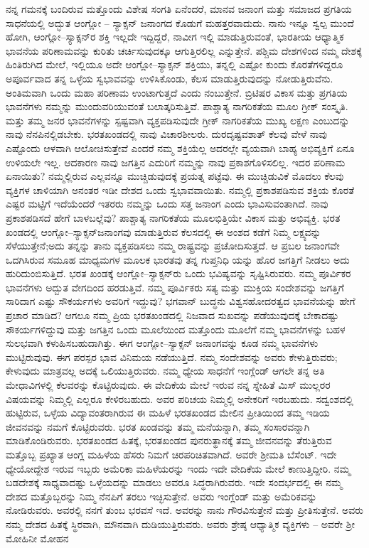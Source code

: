 ನನ್ನ ಗಮನಕ್ಕೆ ಬಂದಿರುವ ಮತ್ತೊಂದು ವಿಶೇಷ ಸಂಗತಿ ಏನೆಂದರೆ, ಮಾನವ ಜನಾಂಗ ಮತ್ತು ಸಮಾಜದ ಪ್ರಗತಿಯ ಸಾಧನೆಯಲ್ಲಿ ಅದ್ಭುತ ಆಂಗ್ಲೋ – ಸ್ಯಾಕ್ಸನ್​ ಜನಾಂಗದ ಕೊಡುಗೆ ಮಹತ್ತರವಾದುದು. ನಾನು ಇನ್ನೂ ಸ್ವಲ್ಪ ಮುಂದೆ ಹೋಗಿ, ಆಂಗ್ಲೋ–ಸ್ಯಾಕ್ಸನ್​ರ ಶಕ್ತಿ ಇಲ್ಲದೇ ಇದ್ದಿದ್ದರೆ, ನಾವೀಗ ಇಲ್ಲಿ ಮಾಡುತ್ತಿರುವಂತೆ, ಭಾರತೀಯ ಆಧ್ಯಾತ್ಮಿಕ ಭಾವನೆಯ ಪರಿಣಾಮವನ್ನು ಕುರಿತು ಚರ್ಚಿಸುವುದಕ್ಕೂ ಆಗುತ್ತಿರಲಿಲ್ಲ ಎನ್ನುತ್ತೇನೆ. ಪಶ್ಚಿಮ ದೇಶಗಳಿಂದ ನಮ್ಮ ದೇಶಕ್ಕೆ ಹಿಂತಿರುಗಿದ ಮೇಲೆ, ಇಲ್ಲಿಯೂ ಅದೇ ಆಂಗ್ಲೋ–ಸ್ಯಾಕ್ಸನ್​ ಶಕ್ತಿಯು, ತನ್ನಲ್ಲಿ ಎಷ್ಟೋ ಕುಂದು ಕೊರತೆಗಳಿದ್ದರೂ ಅಪೂರ್ವವಾದ ತನ್ನ ಒಳ್ಳೆಯ ಸ್ವಭಾವವನ್ನು ಉಳಿಸಿಕೊಂಡು, ಕೆಲಸ ಮಾಡುತ್ತಿರುವುದನ್ನು ನೋಡುತ್ತಿರುವೆನು. ಅಂತಿಮವಾಗಿ ಒಂದು ಮಹಾ ಪರಿಣಾಮ ಉಂಟಾಗುತ್ತದೆ ಎಂದು ನಂಬುತ್ತೇನೆ. ಬ್ರಿಟಿಷರ ವಿಕಾಸ ಮತ್ತು ಪ್ರಗತಿಯ ಭಾವನೆಗಳು ನಮ್ಮನ್ನು ಮುಂದುವರಿಯುವಂತೆ ಬಲಾತ್ಕರಿಸುತ್ತಿವೆ. ಪಾಶ್ಚಾತ್ಯ ನಾಗರಿಕತೆಯ ಮೂಲ ಗ್ರೀಕ್​ ಸಂಸ್ಕೃತಿ. ಮತ್ತು ತಮ್ಮ ಜನರ ಭಾವನೆಗಳನ್ನು ಸ್ಪಷ್ಟವಾಗಿ ವ್ಯಕ್ತಪಡಿಸುವುದೇ ಗ್ರೀಕ್​ ನಾಗರಿಕತೆಯ ಮುಖ್ಯ ಲಕ್ಷಣ ಎಂಬುದನ್ನು ನಾವು ನೆನಪಿನಲ್ಲಿಡಬೇಕು. ಭರತಖಂಡದಲ್ಲಿ ನಾವು ವಿಚಾರಶೀಲರು. ದುರದೃಷ್ಟವಶಾತ್​ ಕೆಲವು ವೇಳೆ ನಾವು ಎಷ್ಟೊಂದು ಆಳವಾಗಿ ಆಲೋಚಿಸುತ್ತೇವೆ ಎಂದರೆ ನಮ್ಮ ಶಕ್ತಿಯೆಲ್ಲ ಅದರಲ್ಲೇ ವ್ಯಯವಾಗಿ ಬಾಹ್ಯ ಅಭಿವ್ಯಕ್ತಿಗೆ ಏನೂ ಉಳಿಯಲೇ ಇಲ್ಲ. ಆದಕಾರಣ ನಾವು ಜಗತ್ತಿನ ಎದುರಿಗೆ ನಮ್ಮನ್ನು ನಾವು ಪ್ರಕಾಶಗೊಳಿಸಲಿಲ್ಲ. ಇದರ ಪರಿಣಾಮ ಏನಾಯಿತು? ನಮ್ಮಲ್ಲಿರುವ ಎಲ್ಲವನ್ನೂ ಮುಚ್ಚಿಡುವುದಕ್ಕೆ ಪ್ರಯತ್ನ ಪಟ್ಟೆವು. ಈ ಮುಚ್ಚಿಡುವಿಕೆ ಮೊದಲು ಕೆಲವು ವ್ಯಕ್ತಿಗಳ ಚಾಳಿಯಾಗಿ ಅನಂತರ ಇಡೀ ದೇಶದ ಒಂದು ಸ್ವಭಾವವಾಯಿತು. ನಮ್ಮಲ್ಲಿ ಪ್ರಕಾಶಪಡಿಸುವ ಶಕ್ತಿಯ ಕೊರತೆ ಎಷ್ಟರ ಮಟ್ಟಿಗೆ ಇದೆಯೆಂದರೆ ಇತರರು ನಮ್ಮನ್ನು ಒಂದು ಸತ್ತ ಜನಾಂಗ ಎಂದು ಭಾವಿಸುವಂತಾಗಿದೆ. ನಾವು ಪ್ರಕಾಶಪಡಿಸದೆ ಹೇಗೆ ಬಾಳಬಲ್ಲೆವು? ಪಾಶ್ಚಾತ್ಯ ನಾಗರಿಕತೆಯ ಮೂಲಭಿತ್ತಿಯೇ ವಿಕಾಸ ಮತ್ತು ಅಭಿವ್ಯಕ್ತಿ. ಭರತ ಖಂಡದಲ್ಲಿ ಆಂಗ್ಲೋ–ಸ್ಯಾಕ್ಸನ್​ ಜನಾಂಗವು ಮಾಡುತ್ತಿರುವ ಕೆಲಸದಲ್ಲಿ ಈ ಅಂಶದ ಕಡೆಗೆ ನಿಮ್ಮ ಲಕ್ಷ್ಯವನ್ನು ಸೆಳೆಯುತ್ತೇನೆ;ಅದು ತನ್ನನ್ನು ತಾನು ವ್ಯಕ್ತಪಡಿಸಲು ನಮ್ಮ ರಾಷ್ಟ್ರವನ್ನು ಪ್ರಚೋದಿಸುತ್ತದೆ. ಆ ಪ್ರಬಲ ಜನಾಂಗವೇ ಒದಗಿಸಿರುವ ಸಮೂಹ ಮಾಧ್ಯಮಗಳ ಮೂಲಕ ಭಾರತವು ತನ್ನ ಗುಪ್ತನಿಧಿ ಯನ್ನು ಹೊರ ಜಗತ್ತಿಗೆ ನೀಡಲು ಅದು ಹುರಿದುಂಬಿಸುತ್ತಿದೆ. ಭರತ ಖಂಡಕ್ಕೆ ಆಂಗ್ಲೋ–ಸ್ಯಾಕ್ಸನ್​ರು ಒಂದು ಭವಿಷ್ಯವನ್ನು ಸೃಷ್ಟಿಸಿರುವರು. ನಮ್ಮ ಪೂರ್ವಿಕರ ಭಾವನೆಗಳು ಅದ್ಬುತ ವೇಗದಿಂದ ಹರಡುತ್ತಿವೆ. ನಮ್ಮ ಪೂರ್ವಿಕರು ಸತ್ಯ ಮತ್ತು ಮುಕ್ತಿಯ ಸಂದೇಶವನ್ನು ಜಗತ್ತಿಗೆ ಸಾರಿದಾಗ ಎಷ್ಟು ಸೌಕರ್ಯಗಳು ಅವರಿಗೆ ಇದ್ದುವು? ಭಗವಾನ್​ ಬುದ್ಧನು ವಿಶ್ವಸಹೋದರತ್ವದ ಭಾವನೆಯನ್ನು ಹೇಗೆ ಪ್ರಚಾರ ಮಾಡಿದ? ಆಗಲೂ ನಮ್ಮ ಪ್ರಿಯ ಭರತಖಂಡದಲ್ಲಿ ನಿಜವಾದ ಸುಖವನ್ನು ಪಡೆಯುವುದಕ್ಕೆ ಬೇಕಾದಷ್ಟು ಸೌಕರ್ಯಗಳಿದ್ದುವು ಮತ್ತು ಜಗತ್ತಿನ ಒಂದು ಮೂಲೆಯಿಂದ ಮತ್ತೊಂದು ಮೂಲೆಗೆ ನಮ್ಮ ಭಾವನೆಗಳನ್ನು ಬಹಳ ಸುಲಭವಾಗಿ ಕಳುಹಿಸಬಹುದಾಗಿತ್ತು. ಈಗ ಆಂಗ್ಲೋ–ಸ್ಯಾಕ್ಸನ್​ ಜನಾಂಗವನ್ನು ಕೂಡ ನಮ್ಮ ಭಾವನೆಗಳು ಮುಟ್ಟಿರುವುವು. ಈಗ ಪರಸ್ಪರ ಭಾವ ವಿನಿಮಯ ನಡೆಯುತ್ತಿದೆ. ನಮ್ಮ ಸಂದೇಶವನ್ನು ಅವರು ಕೇಳುತ್ತಿರುವರು; ಕೇಳುವುದು ಮಾತ್ರವಲ್ಲ ಅದಕ್ಕೆ ಒಲಿಯುತ್ತಿರುವರು. ನಮ್ಮ ಧ್ಯೇಯ ಸಾಧನೆಗೆ ಇಂಗ್ಲೆಂಡ್​ ಆಗಲೇ ತನ್ನ ಅತಿ ಮೇಧಾವಿಗಳಲ್ಲಿ ಕೆಲವರನ್ನು ಕೊಟ್ಟಿರುವುದು. ಈ ವೇದಿಕೆಯ ಮೇಲೆ ಇರುವ ನನ್ನ ಸ್ನೇಹಿತೆ ಮಿಸ್​ ಮುಲ್ಲರರ ವಿಷಯವನ್ನು ನಿಮ್ಮಲ್ಲಿ ಎಲ್ಲರೂ ಕೇಳಿರಬಹುದು. ಅವರ ಪರಿಚಯ ನಿಮ್ಮಲ್ಲಿ ಅನೇಕರಿಗೆ ಇರಬಹುದು. ಸದ್ವಂಶದಲ್ಲಿ ಹುಟ್ಟಿರುವ, ಒಳ್ಳೆಯ ವಿದ್ಯಾವಂತರಾಗಿರುವ ಈ ಮಹಿಳೆ ಭರತಖಂಡದ ಮೇಲಿನ ಪ್ರೀತಿಯಿಂದ ತಮ್ಮ ಇಡಿಯ ಜೀವನವನ್ನು ನಮಗೆ ಕೊಟ್ಟಿರುವರು. ಭರತ ಖಂಡವನ್ನು ತಮ್ಮ ಮನೆಯನ್ನಾಗಿ, ತಮ್ಮ ಸಂಸಾರವನ್ನಾಗಿ ಮಾಡಿಕೊಂಡಿರುವರು. ಭರತಖಂಡದ ಹಿತಕ್ಕೆ, ಭರತಖಂಡದ ಪುನರುತ್ಥಾನಕ್ಕೆ ತಮ್ಮ ಜೀವನವನ್ನು ತೆರುತ್ತಿರುವ ಮತ್ತೊಬ್ಬ ಪ್ರಖ್ಯಾತ ಆಂಗ್ಲ ಮಹಿಳೆಯ ಹೆಸರು ನಿಮಗೆ ಚಿರಪರಿಚಿತವಾಗಿದೆ. ಅವರೇ ಶ‍್ರೀಮತಿ ಬೆಸೆಂಟ್​. ಇದೇ ಧ್ಯೇಯೋದ್ದೇಶ ಇರುವ ಇಬ್ಬರು ಅಮೆರಿಕಾ ಮಹಿಳೆಯರನ್ನು ಇಂದು ಇದೇ ವೇದಿಕೆಯ ಮೇಲೆ ಕಾಣುತ್ತಿದ್ದೀರಿ. ನಮ್ಮ ಬಡದೇಶಕ್ಕೆ ಸಾಧ್ಯವಾದಷ್ಟು ಒಳ್ಳೆಯದನ್ನು ಮಾಡಲು ಅವರೂ ಸಿದ್ಧರಾಗಿರುವರು. ಇದೇ ಸಂದರ್ಭದಲ್ಲಿ ಈ ನಮ್ಮ ದೇಶದ ಮತ್ತೊಬ್ಬರನ್ನು ನಿಮ್ಮ ನೆನಪಿಗೆ ತರಲು ಇಚ್ಛಿಸುತ್ತೇನೆ. ಅವರು ಇಂಗ್ಲೆಂಡ್​ ಮತ್ತು ಅಮೆರಿಕವನ್ನು ನೋಡಿರುವರು. ಅವರಲ್ಲಿ ನನಗೆ ತುಂಬ ಭರವಸೆ ಇದೆ. ಅವರನ್ನು ನಾನು ಗೌರವಿಸುತ್ತೇನೆ ಮತ್ತು ಪ್ರೀತಿಸುತ್ತೇನೆ. ಅವರು ನಮ್ಮ ದೇಶದ ಹಿತಕ್ಕೆ ಸ್ಥಿರವಾಗಿ, ಮೌನವಾಗಿ ದುಡಿಯುತ್ತಿರುವರು. ಅವರು ಶ್ರೇಷ್ಠ ಆಧ್ಯಾತ್ಮಿಕ ವ್ಯಕ್ತಿಗಳು – ಅವರೇ ಶ‍್ರೀ ಮೋಹಿನೀ ಮೋಹನ 